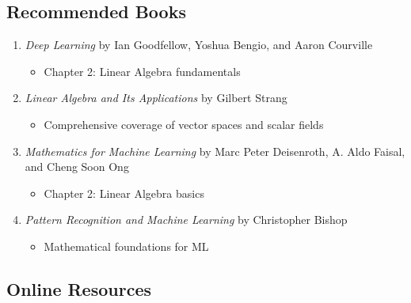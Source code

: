 \documentclass[11pt,a4paper]{article}
\begin{document}
\subsection{Recommended Books}

\begin{enumerate}
    \item \textit{Deep Learning} by Ian Goodfellow, Yoshua Bengio, and Aaron Courville
    \begin{itemize}
        \item Chapter 2: Linear Algebra fundamentals
    \end{itemize}
    
    \item \textit{Linear Algebra and Its Applications} by Gilbert Strang
    \begin{itemize}
        \item Comprehensive coverage of vector spaces and scalar fields
    \end{itemize}
    
    \item \textit{Mathematics for Machine Learning} by Marc Peter Deisenroth, A. Aldo Faisal, and Cheng Soon Ong
    \begin{itemize}
        \item Chapter 2: Linear Algebra basics
    \end{itemize}
    
    \item \textit{Pattern Recognition and Machine Learning} by Christopher Bishop
    \begin{itemize}
        \item Mathematical foundations for ML
    \end{itemize}
\end{enumerate}

\subsection{Online Resources}
\end{document}

